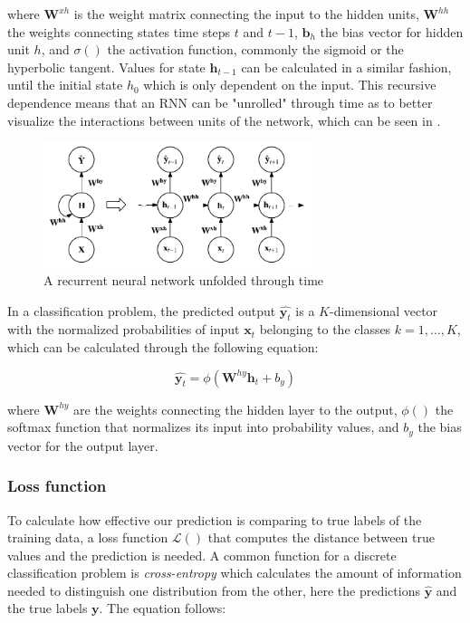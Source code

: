 \documentclass{kththesis}
\begin{document}
where $\mathbf{W}^{xh}$ is the weight matrix connecting the input to the hidden units, $\mathbf{W}^{hh}$ the weights connecting states time steps $t$ and $t-1$, $\mathbf{b}_h$ the bias vector for hidden unit $h$, and $\sigma()$ the activation function, commonly the sigmoid or the hyperbolic tangent. Values for state $\mathbf{h}_{t-1}$ can be calculated in a similar fashion, until the initial state $h_0$ which is only dependent on the input. This recursive dependence means that an RNN can be "unrolled" through time as to better visualize the interactions between units of the network, which can be seen in .

\begin{figure}[h]
    \centering
    \includegraphics[width=0.7\textwidth,keepaspectratio]{figures/rnn.pdf}
    \caption{A recurrent neural network unfolded through time}
    \label{fig:rnn}
\end{figure}

In a classification problem, the predicted output $\hat{\mathbf{y}_t}$ is a $K$-dimensional vector with the normalized probabilities of input $\mathbf{x}_t$ belonging to the classes $k=1,...,K$, which can be calculated through the following equation:

\begin{equation}
\hat{\mathbf{y}_t} = \phi(\mathbf{W}^{hy}\mathbf{h}_t + b_y)
\end{equation}

where $\mathbf{W}^{hy}$ are the weights connecting the hidden layer to the output, $\phi()$ the softmax function that normalizes its input into probability values, and $b_y$ the bias vector for the output layer. 

\subsubsection{Loss function}

To calculate how effective our prediction is comparing to true labels of the training data, a loss function $\mathcal{L}()$ that computes the distance between true values and the prediction is needed. A common function for a discrete classification problem is \emph{cross-entropy} which calculates the amount of information needed to distinguish one distribution from the other\citep{buja2005loss}, here the predictions $\hat{\mathbf{y}}$ and the true labels $\mathbf{y}$. The equation follows:
\end{document}
